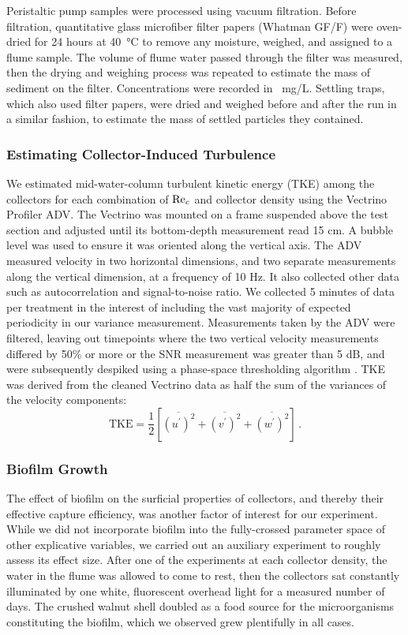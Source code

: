 \documentclass[geosciences,article,submit,moreauthors,pdftex]{Definitions/mdpi}
\begin{document}
Peristaltic pump samples were processed using vacuum filtration. Before filtration, quantitative glass microfiber filter papers (Whatman GF/F) were oven-dried for 24 hours at \SI{40}{\celsius} to remove any moisture, weighed, and assigned to a flume sample. The volume of flume water passed through the filter was measured, then the drying and weighing process was repeated to estimate the mass of sediment on the filter. Concentrations were recorded in \SI{}{\milli\gram/\liter}. Settling traps, which also used filter papers, were dried and weighed before and after the run in a similar fashion, to estimate the mass of settled particles they contained.

\subsubsection{Estimating Collector-Induced Turbulence}

We estimated mid-water-column turbulent kinetic energy (TKE) among the collectors for each combination of $\mathrm{Re}_c$ and collector density using the Vectrino Profiler ADV. The Vectrino was mounted on a frame suspended above the test section and adjusted until its bottom-depth measurement read 15 cm. A bubble level was used to ensure it was oriented along the vertical axis. The ADV measured velocity in two horizontal dimensions, and two separate measurements along the vertical dimension, at a frequency of 10 Hz. It also collected other data such as autocorrelation and signal-to-noise ratio. We collected 5 minutes of data per treatment in the interest of including the vast majority of expected periodicity in our variance measurement. Measurements taken by the ADV were filtered, leaving out timepoints where the two vertical velocity measurements differed by 50\% or more or the SNR measurement was greater than 5 dB, and were subsequently despiked using a phase-space thresholding algorithm \cite{goring_nikora}. TKE was derived from the cleaned Vectrino data as half the sum of the variances of the velocity components:
\begin{equation}
    \text{TKE} = \frac{1}{2}[\overline{(u^\prime)^2} + \overline{(v^\prime)^2} + \overline{(w^\prime)^2}]\,.
    \label{eqn:TKE}
\end{equation}

\subsubsection{Biofilm Growth}

The effect of biofilm on the surficial properties of collectors, and thereby their effective capture efficiency, was another factor of interest for our experiment. While we did not incorporate biofilm into the fully-crossed parameter space of other explicative variables, we carried out an auxiliary experiment to roughly assess its effect size. After one of the experiments at each collector density, the water in the flume was allowed to come to rest, then the collectors sat constantly illuminated by one white, fluorescent overhead light for a measured number of days. The crushed walnut shell doubled as a food source for the microorganisms constituting the biofilm, which we observed grew plentifully in all cases.
\end{document}
